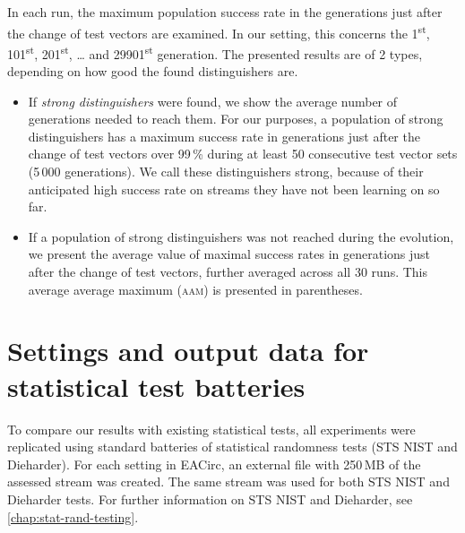 \documentclass[12pt,oneside]{fithesis2}
\begin{document}
In each run, the maximum population success rate in the generations just after the change of test vectors are examined.
In our setting, this concerns the 1\textsuperscript{st}, 101\textsuperscript{st}, 201\textsuperscript{st}, \dots{} 
and 29901\textsuperscript{st} generation.
The presented results are of 2 types, depending on how good the found distinguishers are.
\begin{itemize}
\item If \textit{strong distinguishers} were found, we show the average number of generations needed
to reach them. For our purposes, a population of strong distinguishers has a maximum success rate in generations just
after the change of test vectors over 99\,\% during at least 50 consecutive test vector sets (5\,000 generations).
We call these distinguishers strong, because of their anticipated high success rate on streams they have not been learning on so far.
\item If a population of strong distinguishers was not reached during the evolution, 
we present the average value of maximal success rates in generations just after the change of test vectors,
further averaged across all 30 runs. This average average maximum (\textsc{aam}) is presented in parentheses.
\end{itemize}

\section{Settings and output data for statistical test batteries}
\label{sec:settings-statistics}

To compare our results with existing statistical tests, all experiments were replicated using standard batteries of statistical
randomness tests (STS NIST and Dieharder). 
For each setting in EACirc, an external file with 250\,MB of the assessed stream was created.
The same stream was used for both STS NIST and Dieharder tests. For further information on STS NIST and Dieharder, 
see \autoref{chap:stat-rand-testing}.
\end{document}
